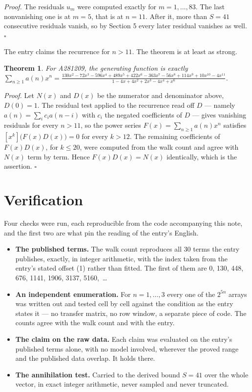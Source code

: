 \documentclass[11pt]{article}
\newtheorem{theorem}{Theorem}
\theoremstyle{definition}
\begin{document}
{\itshape Proof.} The residuals $u_m$ were computed exactly for $m = 1,\dots,83$. The last nonvanishing one is at $m = 5$, that is at $n = 11$. After it, more than $S = 41$ consecutive residuals vanish, so by Section 5 every later residual vanishes as well. $\square$

The entry claims the recurrence for $n > 11$. The theorem is at least as strong.

\begin{theorem} For A281209, the generating function is exactly $\sum_{n\ge 1} a(n)x^n = \frac{130x^{2} - 72x^{3} - 596x^{4} + 489x^{5} + 422x^{6} - 363x^{7} - 56x^{8} + 114x^{9} + 10x^{10} - 4x^{11}}{1 - 4x + 4x^{2} + 2x^{3} - 4x^{4} + x^{6}}$.\end{theorem}

{\itshape Proof.} Let $N(x)$ and $D(x)$ be the numerator and denominator above, $D(0)=1$. The residual test applied to the recurrence read off $D$ --- namely $a(n) = \sum_i c_i a(n-i)$ with $c_i$ the negated coefficients of $D$ --- gives vanishing residuals for every $n > 11$, so the power series $F(x)=\sum_{n\ge 1}a(n)x^n$ satisfies $[x^k]\bigl(F(x)D(x)\bigr) = 0$ for every $k > 12$. The remaining coefficients of $F(x)D(x)$, for $k \le 20$, were computed from the walk count and agree with $N(x)$ term by term. Hence $F(x)D(x) = N(x)$ identically, which is the assertion. $\square$

\section{Verification}

Four checks were run, each reproducible from the code accompanying this note, and the first two are what pin the reading of the entry's English.

\begin{itemize}

\item {\bfseries The published terms.} The walk count reproduces all 30 terms the entry publishes, exactly, in integer arithmetic, with the index taken from the entry's stated offset (1) rather than fitted. The first of them are 0, 130, 448, 676, 1141, 1906, 3137, 5160,~\dots

\item {\bfseries An independent enumeration.} For $n = 1,\dots,3$ every one of the $2^{5n}$ arrays was written out and tested cell by cell against the condition as the entry states it --- no transfer matrix, no row window, a separate piece of code. The counts agree with the walk count and with the entry.

\item {\bfseries The claim on the raw data.} Each claim was evaluated on the entry's published terms alone, with no model involved, wherever the proved range and the published data overlap. It holds there.

\item {\bfseries The annihilation test.} Carried to the derived bound $S = 41$ over the whole vector, in exact integer arithmetic, never sampled and never truncated.

\end{itemize}
\end{document}
